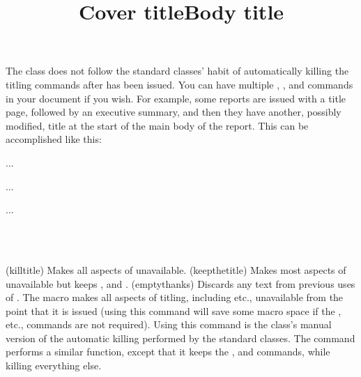    The class does not follow the standard classes' habit
of automatically killing the titling
commands after \cmd{\maketitle} has been issued. You can have multiple
\cmd{\title}, \cmd{\author}, \cmd{\date} and \cmd{\maketitle} 
commands in your
document if you wish. For example, some reports are issued with
a title page, followed by an executive summary, and then they
have another, possibly modified, title at the start of
the main body of the report. This can be accomplished like this:
\begin{lcode}
\title{Cover title}
...
\begin{titlingpage}
\maketitle
\end{titlingpage}
...
\title{Body title}
\maketitle
...
\end{lcode}

\begin{syntax}
\cmd{\killtitle} \cmd{\keepthetitle} \\
\cmd{\emptythanks} \\
\end{syntax}
\glossary(killtitle)%
  {}%
  {Makes all aspects of  unavailable.}
\glossary(keepthetitle)%
  {}%
  {Makes most aspects of  unavailable but keeps ,
   and .}
\glossary(emptythanks)%
  {}%
  {Discards any text from previous uses of .}
    The \cmd{\killtitle} macro makes all aspects of titling, including
\cmd{\thetitle} etc.,
unavailable from the point that it is issued (using this command will save
some macro space if the \cmd{\thetitle}, etc., commands are not required).
Using this command is the class's manual version
of the automatic killing performed by the standard classes.
The \cmd{\keepthetitle} command performs a similar function, except that
it keeps the \cmd{\thetitle}, \cmd{\theauthor} and \cmd{\thedate} commands,
 while killing everything else.

